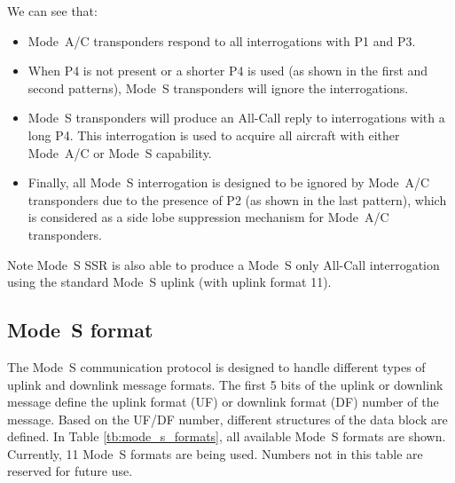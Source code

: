 We can see that:

\begin{itemize}
  \item Mode~A/C transponders respond to all interrogations with P1 and P3.
  \item When P4 is not present or a shorter P4 is used (as shown in the first and second patterns), Mode~S transponders will ignore the interrogations.
  \item Mode~S transponders will produce an All-Call reply to interrogations with a long P4. This interrogation is used to acquire all aircraft with either Mode~A/C or Mode~S capability.
  \item Finally, all Mode~S interrogation is designed to be ignored by Mode~A/C transponders due to the presence of P2 (as shown in the last pattern), which is considered as a side lobe suppression mechanism for Mode~A/C transponders.
\end{itemize}


\begin{notebox}{Note}
  Mode~S SSR is also able to produce a Mode~S only All-Call interrogation using the standard Mode~S uplink (with uplink format 11).
\end{notebox}


\subsection{Mode~S format}

The Mode~S communication protocol is designed to handle different types of uplink and downlink message formats. The first 5 bits of the uplink or downlink message define the uplink format (UF) or downlink format (DF) number of the message. Based on the UF/DF number, different structures of the data block are defined. In Table \ref{tb:mode_s_formats}, all available Mode~S formats are shown. Currently, 11 Mode~S formats are being used. Numbers not in this table are reserved for future use.

